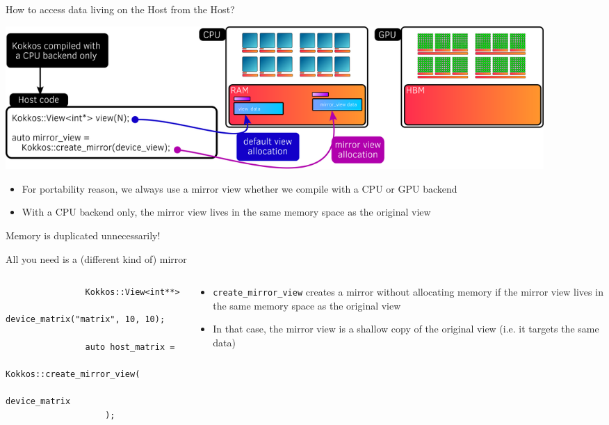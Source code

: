 \documentclass[
    aspectratio=169,
]{beamer}
\begin{document}

\begin{frame}{How to access data living on the Host from the Host?}
    \begin{center}
        \includegraphics[width=0.9\textwidth]{host_mirror_view.png}
    \end{center}
    \begin{itemize}
        \item For portability reason, we always use a mirror view whether we compile with a CPU or GPU backend
        \item With a CPU backend only, the mirror view lives in the same memory space as the original view
    \end{itemize}

     Memory is duplicated unnecessarily!
\end{frame}


\begin{frame}[fragile]{All you need is a (different kind of) mirror}
    \begin{columns}
        \begin{column}{0.525\linewidth}
            \begin{verbatim}
                Kokkos::View<int**>
                    device_matrix("matrix", 10, 10);

                auto host_matrix =
                    Kokkos::create_mirror_view(
                        device_matrix
                    );
            \end{verbatim}
        \end{column}
        \begin{column}{0.475\linewidth}
            \begin{itemize}
                \item \texttt{create\_mirror\_view} creates a mirror without allocating memory if the mirror view lives in the same memory space as the original view
                \item In that case, the mirror view is a shallow copy of the original view (i.e. it targets the same data)
            \end{itemize}
        \end{column}
    \end{columns}
\end{frame}
\end{document}

